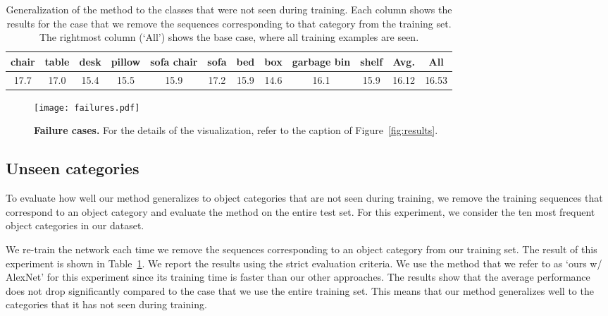 \documentclass[runningheads]{llncs}
\begin{document}
\begin{table}[t]
\setlength{\tabcolsep}{3pt}
\begin{center}
\begin{tabular}{|c|c|c|c|c|c|c|c|c|c|c||c|}
    \hline
	chair & table & desk & pillow & sofa chair & sofa & bed & box & garbage bin & shelf & \textbf{Avg.} & \textbf{All}\\ 
	\hline
17.7 & 17.0 & 15.4 & 15.5 & 15.9 & 17.2 & 15.9 & 14.6 & 16.1 & 15.9 & 16.12 & 16.53 \\
    \hline
\end{tabular}
\end{center}
\caption{Generalization of the method to the classes that were not seen during training. Each column shows the results for the case that we remove the sequences corresponding to that category from the training set. The rightmost column (`All') shows the base case, where all training examples are seen.}
\label{tab:zeroshot}
\end{table}

\begin{figure*}[t]
\centering
  \texttt{[image: failures.pdf]}
\caption{\textbf{Failure cases.} For the details of the visualization, refer to the caption of Figure~\ref{fig:results}.}
\label{fig:failure}
\end{figure*} 


\subsection{Unseen categories}
To evaluate how well our method generalizes to object categories that are not seen during training, we remove the training sequences that correspond to an object category and evaluate the method on the entire test set. For this experiment, we consider the ten most frequent object categories in our dataset. 

We re-train the network each time we remove the sequences corresponding to an object category from our training set. The result of this experiment is shown in Table~\ref{tab:zeroshot}. We report the results using the strict evaluation criteria. We use the method that we refer to as `ours w/ AlexNet' for this experiment since its training time is faster than our other approaches. The results show that the average performance does not drop significantly compared to the case that we use the entire training set. This means that our method generalizes well to the categories that it has not seen during training. 
\end{document}
